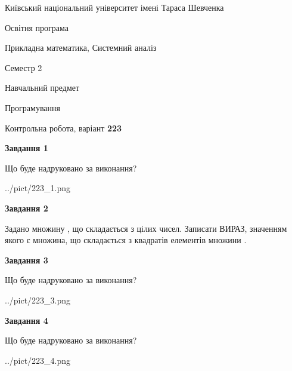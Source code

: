 \documentclass[12pt, ukrainian]{article}
\begin{document}
{{\begin {small}\par
{ \center  Київський національний університет імені Тараса Шевченка \par}
{\parbox {5 cm}{Освітня програма \hfill}{\parbox {8 cm}{Прикладна математика, Системний аналіз \hfill}}\parbox {5 cm}{\hfill Семестр 2}}\par
{\parbox {5 cm} {Навчальний предмет \hfill}\parbox {7 cm}{Програмування \hfill}\parbox {6cm}{\hfill}\par}\vspace{-7pt} \end{small}}{\center Контрольна робота, варіант  \No \textbf
{ 223 }\par}}
{
\begin {large}
{\begin {center}\textbf{Завдання 1}\end {center}}\par
Що буде надруковано за виконання?\par\par
\begin{center}
	{../pict/223_1.png}
\end{center}
\newpage

{\begin {center}\textbf{Завдання 2}\end {center}}\par
Задано множину , що складається з цілих чисел. Записати ВИРАЗ, значенням якого є множина, що складається  з квадратів елементів множини .\par
\newpage

{\begin {center}\textbf{Завдання 3}\end {center}}\par
Що буде надруковано за виконання?
\begin{center}
	{../pict/223_3.png}
\end{center}
\newpage

{\begin {center}\textbf{Завдання 4}\end {center}}\par
Що буде надруковано за виконання?\par
\begin{center}
	{../pict/223_4.png}
\end{center}
\newpage


\end{large}}
\end{document}
